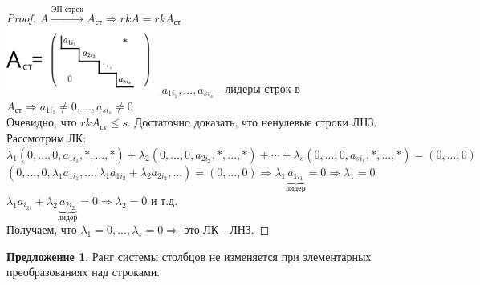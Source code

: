 \documentclass[a4paper, 12pt]{article}
\newcounter{offercount}
\theoremstyle{definition}
\newtheorem{offernum}[offercount]{Предложение}
\begin{document}
  \begin{proof}
    $A \overset{\text{ЭП строк}}{\longrightarrow } A_{\text{ст}} \Longrightarrow  rkA = rkA_{\text{ст}}$ \\
    \includegraphics[width=5cm]{image/lecture-5.pdf}
    $a_{1i_1},...,a_{si_s}$ - лидеры строк в $A_{\text{ст}} \Longrightarrow a_{1i_1} \neq 0,...,a_{si_s} \neq 0$ \\
    Очевидно, что $rkA_{\text{ст}}\leq s$. Достаточно доказать, что ненулевые строки ЛНЗ. 
    Рассмотрим ЛК: \\
    $\lambda_1(0,...,0,a_{1i_1},\ast,...,\ast) + \lambda_2(0,...,0,a_{2i_2},\ast,...,\ast) + \cdots + \lambda_s(0,...,0,a_{si_s},\ast,...,\ast) = (0,...,0)$ \\
    $(0,...,0,\lambda_1 a_{1i_1},...,\lambda_1a_{1i_2} + \lambda_2a_{2i_2},...) = (0,...,0) \Longrightarrow \lambda_1 \underbrace {a_{1i_1}}_{\text{лидер}}= 0 \Longrightarrow \lambda_1 = 0$ \\
    $\lambda_1a_{i_21} + \lambda_2\underbrace {a_{2i_2}}_{\text{лидер}} = 0 \Longrightarrow \lambda_2 = 0$ и т.д. \\
    Получаем, что $\lambda_1 = 0,...,\lambda_s = 0 \Longrightarrow$ это ЛК - ЛНЗ. 
  \end{proof} 
  \begin{offernum}
    Ранг системы столбцов не изменяется при элементарных преобразованиях над строками.
  \end{offernum}
\end{document}
